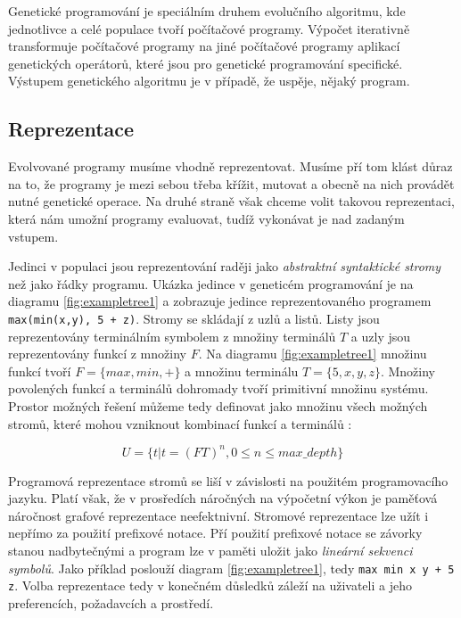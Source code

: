 Genetické programování je speciálním druhem evolučního algoritmu, kde jednotlivce a 
celé populace tvoří počítačové programy. Výpočet iterativně transformuje počítačové
programy na jiné počítačové programy aplikací genetických operátorů, které jsou 
pro genetické programování specifické. Výstupem genetického algoritmu
je v případě, že uspěje, nějaký program. 

\subsection{Reprezentace}
Evolvované programy musíme vhodně reprezentovat. Musíme pří tom klást důraz na to,
že programy je mezi sebou třeba křížit, mutovat a obecně na nich provádět nutné
genetické operace. Na druhé straně však chceme volit takovou reprezentaci, která
nám umožní programy evaluovat, tudíž vykonávat je nad zadaným vstupem. 

Jedinci v populaci jsou reprezentování raději jako \textit{abstraktní syntaktické stromy}
\cite{GPTutorial} než jako řádky programu. Ukázka jedince v geneticém programování je na
diagramu \ref{fig:exampletree1} a zobrazuje jedince reprezentovaného programem
\texttt{max(min(x,y), 5 + z)}. Stromy se skládají z uzlů a listů. Listy jsou
reprezentovány terminálním symbolem z množiny terminálů $T$ a uzly jsou reprezentovány
funkcí z množiny $F$. Na diagramu \ref{fig:exampletree1} množinu funkcí tvoří 
$F = \{max, min, +\}$ a množinu terminálu $T = \{5, x, y, z\}$. Množiny povolených
funkcí a terminálů dohromady tvoří primitivní množinu systému. Prostor možných 
řešení můžeme tedy definovat jako množinu všech možných stromů, které mohou vzniknout
kombinací funkcí a terminálů :

$$ U = \{t | t=(FT)^{n}, 0 \leq n \leq max\_depth \}$$

Programová reprezentace stromů se liší v závislosti na použitém programovacího jazyku.
Platí však, že 
v prosředích náročných na výpočetní výkon je paměťová náročnost grafové reprezentace
neefektnivní. Stromové reprezentace lze užít i nepřímo za použití prefixové notace.
Pří použití prefixové notace se závorky stanou nadbytečnými a program lze v paměti
uložit jako \textit{lineární sekvenci symbolů}. Jako příklad poslouží diagram 
\ref{fig:exampletree1}, tedy \texttt{max min x y + 5 z}. Volba reprezentace tedy
v konečném důsledků záleží na uživateli a jeho preferencích, požadavcích a prostředí. 


